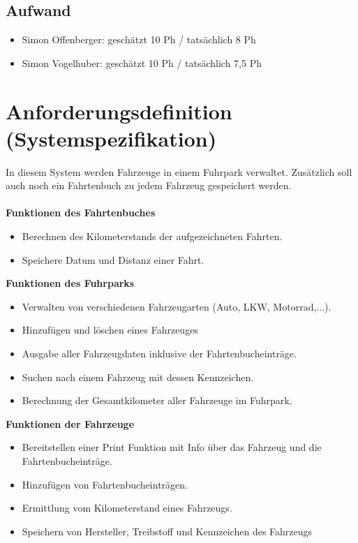 \documentclass[12pt,naustrian,a4widepaper]{scrartcl}
\begin{document}
\subsection{Aufwand}
	
	\begin{itemize}
		\item Simon Offenberger: geschätzt 10 Ph / tatsächlich 8 Ph
		\item Simon Vogelhuber:  geschätzt 10 Ph / tatsächlich 7,5 Ph
	\end{itemize}

\clearpage
\section{Anforderungsdefinition (Systemspezifikation)}
In diesem System werden Fahrzeuge in einem Fuhrpark verwaltet. 
Zusätzlich soll auch noch ein Fahrtenbuch zu jedem Fahrzeug gespeichert werden.
\\
\\
\textbf{Funktionen des Fahrtenbuches}
\begin{itemize}
	\item Berechnen des Kilometerstands der aufgezeichneten Fahrten.
	\item Speichere Datum und Distanz einer Fahrt.
\end{itemize}

\textbf{Funktionen des Fuhrparks}
\begin{itemize}
	\item Verwalten von verschiedenen Fahrzeugarten (Auto, LKW, Motorrad,...).
	\item Hinzufügen und löschen eines Fahrzeuges
	\item Ausgabe aller Fahrzeugdaten inklusive der Fahrtenbucheinträge.
	\item Suchen nach einem Fahrzeug mit dessen Kennzeichen.
	\item Berechnung der Gesamtkilometer aller Fahrzeuge im Fuhrpark.
\end{itemize}

\textbf{Funktionen der Fahrzeuge}
\begin{itemize}
	\item Bereitstellen einer Print Funktion mit Info über das Fahrzeug und die Fahrtenbucheinträge.
	\item Hinzufügen von Fahrtenbucheinträgen.
	\item Ermittlung vom Kilometerstand eines Fahrzeugs.
	\item Speichern von Hersteller, Treibstoff und Kennzeichen des Fahrzeugs
\end{itemize}
\end{document}
